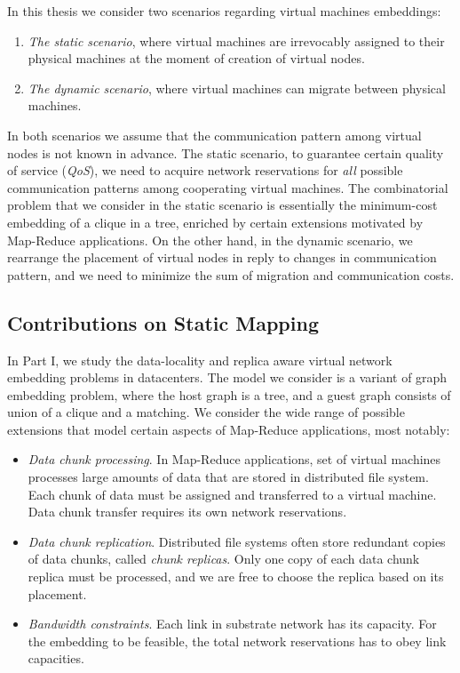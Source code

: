 In this thesis we consider two scenarios regarding virtual machines embeddings:
\begin{enumerate}
  \item \emph{The static scenario}, where virtual machines are irrevocably assigned to their physical machines at the moment of creation of virtual nodes.
  \item \emph{The dynamic scenario}, where virtual machines can migrate between physical machines.
\end{enumerate}

In both scenarios we assume that the communication pattern among virtual nodes is not known in advance.
The static scenario, to guarantee certain quality of service (\emph{QoS}), we need to acquire network reservations for \emph{all} possible communication patterns among cooperating virtual machines.
The combinatorial problem that we consider in the static scenario is essentially the minimum-cost embedding of a clique in a tree, enriched by certain extensions motivated by Map-Reduce applications.
On the other hand, in the dynamic scenario, we rearrange the placement of virtual nodes in reply to changes in communication pattern, and we need to minimize the sum of migration and communication costs.

\subsection{Contributions on Static Mapping}

In Part I, we study the data-locality and replica aware virtual network embedding problems in datacenters.
The model we consider is a variant of graph embedding problem, where the host graph is a tree, and a guest graph consists of union of a clique and a matching.
We consider the wide range of possible extensions that model certain aspects of Map-Reduce applications, most notably:

\begin{itemize}
\item \emph{Data chunk processing}. In Map-Reduce applications, set of virtual machines processes large amounts of data that are stored in distributed file system. Each chunk of data must be assigned and transferred to a virtual machine. Data chunk transfer requires its own network reservations.

\item \emph{Data chunk replication}. Distributed file systems often store redundant copies of data chunks, called \emph{chunk replicas}. Only one copy of each data chunk replica must be processed, and we are free to choose the replica based on its placement.

\item \emph{Bandwidth constraints}. Each link in substrate network has its capacity. For the embedding to be feasible, the total network reservations has to obey link capacities.
\end{itemize}


